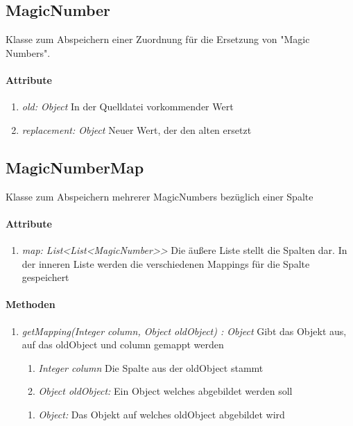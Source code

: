 \subsection*{MagicNumber}\label{magic}
Klasse zum Abspeichern einer Zuordnung für die Ersetzung von \string"Magic Numbers\string".

\paragraph{Attribute}
\begin{enumerate}[-]
	\item \textit{old: Object} In der Quelldatei vorkommender Wert
	\item \textit{replacement: Object} Neuer Wert, der den alten ersetzt
\end{enumerate}


\subsection*{MagicNumberMap}\label{magicMap}
Klasse zum Abspeichern mehrerer MagicNumbers bezüglich einer Spalte

\paragraph{Attribute}
\begin{enumerate}[-]
	\item \textit{map: List<List<MagicNumber>{}>} Die äußere Liste stellt die Spalten dar. In der inneren Liste werden die verschiedenen Mappings für die Spalte gespeichert
\end{enumerate}

\paragraph{Methoden}
\begin{enumerate}[+]
	\item \textit{getMapping(Integer column, Object oldObject) : Object} Gibt das Objekt aus, auf das oldObject und column gemappt werden
	
	\begin{enumerate}[$\bullet$]
		\item \textit{Integer column} Die Spalte aus der oldObject stammt
		\item \textit{Object oldObject:} Ein Object welches abgebildet werden soll
	\end{enumerate}
	\vspace{-0.2cm}
	\begin{enumerate}[$\circ$]
		\item \textit{Object:} Das Objekt auf welches oldObject abgebildet wird
	\end{enumerate}
\end{enumerate}